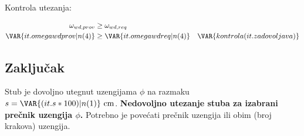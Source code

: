 Kontrola utezanja:

\begin{align*}
\omega_{wd,prov} &\geq \omega_{wd,req} \\
\VAR{it.omegawdprov|n(4)} &\geq \VAR{it.omegawdreq|n(4)} \quad \VAR{kontrola(it.zadovoljava)}
\end{align*}

\subsection{Zaključak}

Stub  je dovoljno utegnut uzengijama $\phi$ na razmaku $s = \VAR{(it.s*100)|n(1)} \ \mathrm{cm}$.
\textbf{Nedovoljno utezanje stuba  za izabrani prečnik uzengija $\phi$.} Potrebno je povećati prečnik uzengija ili obim (broj krakova) uzengija.



